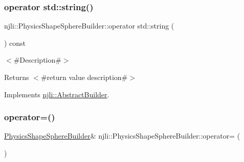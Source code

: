 \subsubsection{\texorpdfstring{operator std\+::string()}{operator std::string()}}
{\footnotesize\ttfamily njli\+::\+Physics\+Shape\+Sphere\+Builder\+::operator std\+::string (\begin{DoxyParamCaption}{ }\end{DoxyParamCaption}) const\hspace{0.3cm}{\ttfamily [virtual]}}

$<$\#\+Description\#$>$

\begin{DoxyReturn}{Returns}
$<$\#return value description\#$>$ 
\end{DoxyReturn}


Implements \mbox{\hyperlink{classnjli_1_1_abstract_builder_a3e6e553e06d1ca30517ad5fb0bd4d000}{njli\+::\+Abstract\+Builder}}.

\mbox{\label{classnjli_1_1_physics_shape_sphere_builder_a94aee97d067c834b14bedda7c2403ee3}} 
\subsubsection{\texorpdfstring{operator=()}{operator=()}}
{\footnotesize\ttfamily \mbox{\hyperlink{classnjli_1_1_physics_shape_sphere_builder}{Physics\+Shape\+Sphere\+Builder}}\& njli\+::\+Physics\+Shape\+Sphere\+Builder\+::operator= (\begin{DoxyParamCaption}\item[{const \mbox{\hyperlink{classnjli_1_1_physics_shape_sphere_builder}{Physics\+Shape\+Sphere\+Builder}} \&}]{ }\end{DoxyParamCaption})\hspace{0.3cm}{\ttfamily [protected]}}

\mbox{\label{classnjli_1_1_physics_shape_sphere_builder_a260f1fc9223583600f1544378b863352}} 
